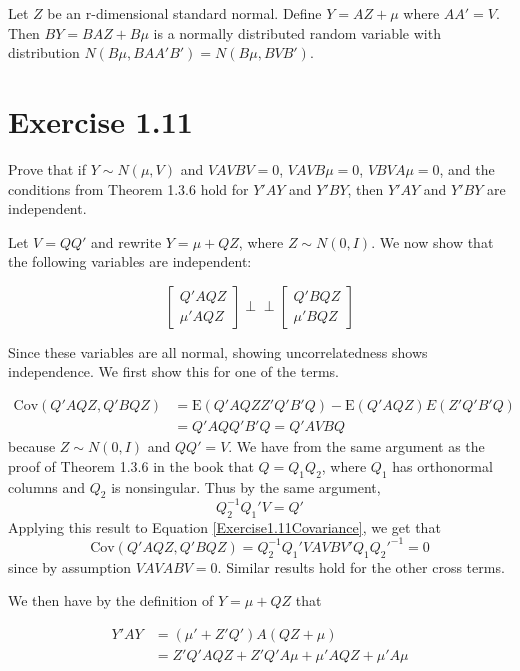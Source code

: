 \documentclass{article}
\newcommand{\indep}{\perp \!\!\! \perp}
\newcommand{\E}{\text{E}}
\newcommand{\cov}{\text{Cov}}
\begin{document}
Let $Z$ be an r-dimensional standard normal. Define $Y = AZ + \mu$ where $AA' = V$. Then $BY = BAZ + B\mu$ is a normally distributed random variable with distribution $N(B\mu, BAA'B') = N(B\mu, BVB')$.

\section*{Exercise 1.11}

Prove that if $Y \sim N(\mu, V)$ and $VAVBV=0$, $VAVB\mu=0$, $VBVA\mu=0$, and the conditions from Theorem 1.3.6 hold for $Y'AY$ and $Y'BY$, then $Y'AY$ and $Y'BY$ are independent.

Let $V=QQ'$ and rewrite $Y=\mu + QZ$, where $Z\sim N(0,I)$. We now show that the following variables are independent:

\begin{equation}
\label{Exercise1.11Independence}
\begin{bmatrix}
Q'AQZ \\
\mu'AQZ
\end{bmatrix}
\indep
\begin{bmatrix}
Q'BQZ \\
\mu'BQZ
\end{bmatrix}
\end{equation}

Since these variables are all normal, showing uncorrelatedness shows independence. We first show this for one of the terms.

\begin{align}
\label{Exercise1.11Covariance}
\cov(Q'AQZ, Q'BQZ) &= \E(Q'AQZZ'Q'B'Q) - \E(Q'AQZ)E(Z'Q'B'Q) \\
&= Q'AQQ'B'Q = Q'AVBQ
\end{align}
because $Z \sim N(0, I)$ and $QQ' = V$. We have from the same argument as the proof of Theorem 1.3.6 in the book that $Q = Q_1Q_2$, where $Q_1$ has orthonormal columns and $Q_2$ is nonsingular. Thus by the same argument,
\[
Q_2^{-1}Q_1'V = Q'
\]
Applying this result to Equation \ref{Exercise1.11Covariance}, we get that
\[
\cov(Q'AQZ, Q'BQZ)=Q_2^{-1}Q_1'VAVBV'Q_1Q_2'^{-1} = 0
\]
since by assumption $VAVABV=0$. Similar results hold for the other cross terms.

We then have by the definition of $Y=\mu+QZ$ that

\begin{align*}
Y'AY &= (\mu'+Z'Q')A(QZ+\mu) \\
&= Z'Q'AQZ + Z'Q'A\mu + \mu'AQZ + \mu'A\mu
\end{align*}
\end{document}
